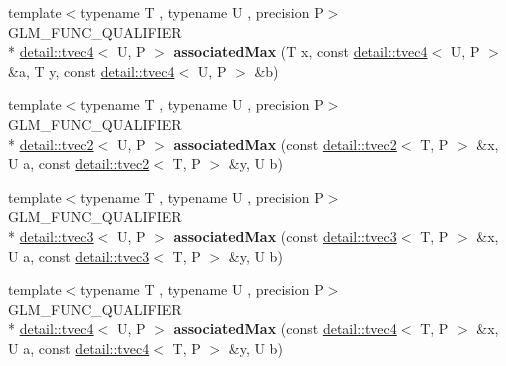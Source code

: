 \begin{DoxyCompactItemize}
\item 
\hypertarget{namespaceglm_ac57a94defad50b236a7a06b1a4989c20}{{\footnotesize template$<$typename T , typename U , precision P$>$ }\\G\-L\-M\-\_\-\-F\-U\-N\-C\-\_\-\-Q\-U\-A\-L\-I\-F\-I\-E\-R \\*
\hyperlink{structglm_1_1detail_1_1tvec4}{detail\-::tvec4}$<$ U, P $>$ {\bfseries associated\-Max} (T x, const \hyperlink{structglm_1_1detail_1_1tvec4}{detail\-::tvec4}$<$ U, P $>$ \&a, T y, const \hyperlink{structglm_1_1detail_1_1tvec4}{detail\-::tvec4}$<$ U, P $>$ \&b)}\label{namespaceglm_ac57a94defad50b236a7a06b1a4989c20}

\item 
\hypertarget{namespaceglm_a77b3777ffa8444c84c785eb0b788a6b1}{{\footnotesize template$<$typename T , typename U , precision P$>$ }\\G\-L\-M\-\_\-\-F\-U\-N\-C\-\_\-\-Q\-U\-A\-L\-I\-F\-I\-E\-R \\*
\hyperlink{structglm_1_1detail_1_1tvec2}{detail\-::tvec2}$<$ U, P $>$ {\bfseries associated\-Max} (const \hyperlink{structglm_1_1detail_1_1tvec2}{detail\-::tvec2}$<$ T, P $>$ \&x, U a, const \hyperlink{structglm_1_1detail_1_1tvec2}{detail\-::tvec2}$<$ T, P $>$ \&y, U b)}\label{namespaceglm_a77b3777ffa8444c84c785eb0b788a6b1}

\item 
\hypertarget{namespaceglm_a40f7f83f46b9e3af8159d06639cc9f9f}{{\footnotesize template$<$typename T , typename U , precision P$>$ }\\G\-L\-M\-\_\-\-F\-U\-N\-C\-\_\-\-Q\-U\-A\-L\-I\-F\-I\-E\-R \\*
\hyperlink{structglm_1_1detail_1_1tvec3}{detail\-::tvec3}$<$ U, P $>$ {\bfseries associated\-Max} (const \hyperlink{structglm_1_1detail_1_1tvec3}{detail\-::tvec3}$<$ T, P $>$ \&x, U a, const \hyperlink{structglm_1_1detail_1_1tvec3}{detail\-::tvec3}$<$ T, P $>$ \&y, U b)}\label{namespaceglm_a40f7f83f46b9e3af8159d06639cc9f9f}

\item 
\hypertarget{namespaceglm_afe37630c8b8738b686795f3540e18433}{{\footnotesize template$<$typename T , typename U , precision P$>$ }\\G\-L\-M\-\_\-\-F\-U\-N\-C\-\_\-\-Q\-U\-A\-L\-I\-F\-I\-E\-R \\*
\hyperlink{structglm_1_1detail_1_1tvec4}{detail\-::tvec4}$<$ U, P $>$ {\bfseries associated\-Max} (const \hyperlink{structglm_1_1detail_1_1tvec4}{detail\-::tvec4}$<$ T, P $>$ \&x, U a, const \hyperlink{structglm_1_1detail_1_1tvec4}{detail\-::tvec4}$<$ T, P $>$ \&y, U b)}\label{namespaceglm_afe37630c8b8738b686795f3540e18433}


\end{DoxyCompactItemize}
